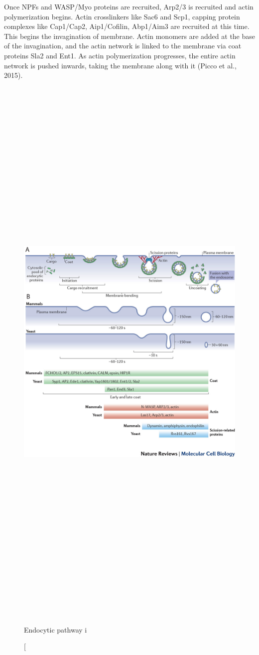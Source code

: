			\vspace{5mm}
Once NPFs and WASP/Myo proteins are recruited, Arp2/3 is recruited and actin polymerization begins. Actin crosslinkers like Sac6 and Scp1, capping protein complexes like Cap1/Cap2, Aip1/Cofilin, Abp1/Aim3 are recruited at this time. This begins the invagination of membrane. Actin monomers are added at the base of the invagination, and the actin network is linked to the membrane via coat proteins Sla2 and Ent1. As actin polymerization progresses, the entire actin network is pushed inwards, taking the membrane along with it (Picco et al., 2015).	

\newpage
\begin{figure}[H]
	\centering
	\hspace{-0.75cm}
		\includegraphics[width=14cm, height=28cm, keepaspectratio]{figures/intro/Fig2_kaksonen}
	\caption[Endocytic pathway i
\end{figure}
